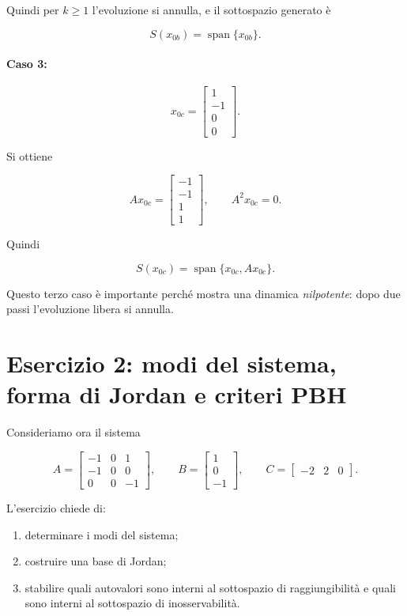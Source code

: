 Quindi per \(k\ge 1\) l'evoluzione si annulla, e il sottospazio generato è

\[
S(x_{0b})=\operatorname{span}\{x_{0b}\}.
\]

\paragraph{Caso 3:}
\[
x_{0c}=
\begin{bmatrix}
1\\-1\\0\\0
\end{bmatrix}.
\]

Si ottiene

\[
Ax_{0c}=
\begin{bmatrix}
-1\\-1\\1\\1
\end{bmatrix},
\qquad
A^2x_{0c}=0.
\]

Quindi

\[
S(x_{0c})=\operatorname{span}\{x_{0c},Ax_{0c}\}.
\]

Questo terzo caso è importante perché mostra una dinamica \emph{nilpotente}: dopo due passi l'evoluzione libera si annulla.

\bigskip

\section{Esercizio 2: modi del sistema, forma di Jordan e criteri PBH}

Consideriamo ora il sistema

\[
A=
\begin{bmatrix}
-1 & 0 & 1\\
-1 & 0 & 0\\
0 & 0 & -1
\end{bmatrix},
\qquad
B=
\begin{bmatrix}
1\\
0\\
-1
\end{bmatrix},
\qquad
C=
\begin{bmatrix}
-2 & 2 & 0
\end{bmatrix}.
\]

L'esercizio chiede di:
\begin{enumerate}
    \item determinare i modi del sistema;
    \item costruire una base di Jordan;
    \item stabilire quali autovalori sono interni al sottospazio di raggiungibilità e quali sono interni al sottospazio di inosservabilità.
\end{enumerate}

